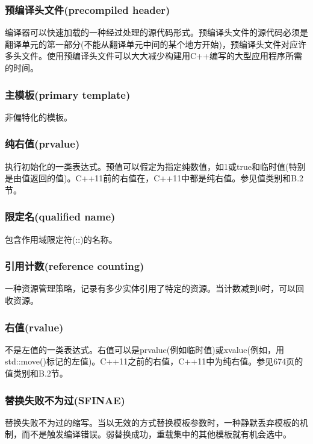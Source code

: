 \subsubsection{预编译头文件(precompiled header)}

编译器可以快速加载的一种经过处理的源代码形式。预编译头文件的源代码必须是翻译单元的第一部分(不能从翻译单元中间的某个地方开始)，预编译头文件对应许多头文件。使用预编译头文件可以大大减少构建用C++编写的大型应用程序所需的时间。

\subsubsection{主模板(primary template)}

非偏特化的模板。

\subsubsection{纯右值(prvalue)}

执行初始化的一类表达式。预值可以假定为指定纯数值，如1或true和临时值(特别是由值返回的值)。C++11前的右值在，C++11中都是纯右值。参见值类别和B.2节。

\subsubsection{限定名(qualified name)}

包含作用域限定符(::)的名称。

\subsubsection{引用计数(reference counting)}

一种资源管理策略，记录有多少实体引用了特定的资源。当计数减到0时，可以回收资源。

\subsubsection{右值(rvalue)}

不是左值的一类表达式。右值可以是prvalue(例如临时值)或xvalue(例如，用std::move()标记的左值)。C++11之前的右值，C++11中为纯右值。参见674页的值类别和B.2节。

\subsubsection{替换失败不为过(SFINAE)}

替换失败不为过的缩写。当以无效的方式替换模板参数时，一种静默丢弃模板的机制，而不是触发编译错误。弱替换成功，重载集中的其他模板就有机会选中。

